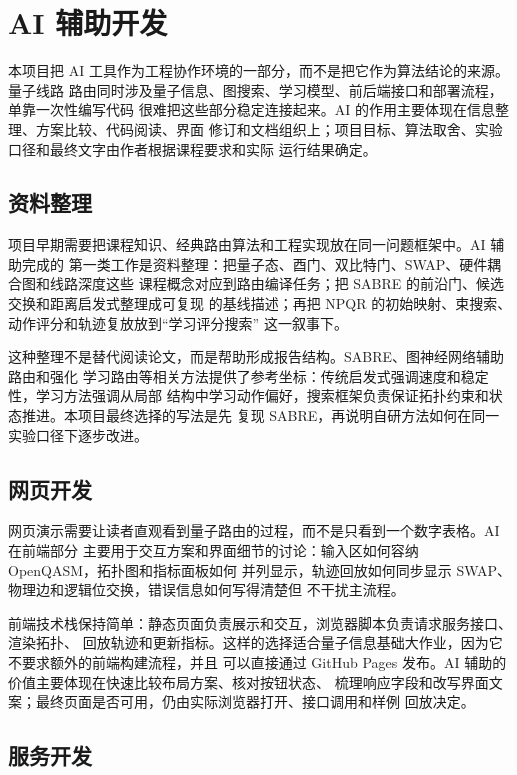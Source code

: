 \section{AI 辅助开发}

本项目把 AI 工具作为工程协作环境的一部分，而不是把它作为算法结论的来源。量子线路
路由同时涉及量子信息、图搜索、学习模型、前后端接口和部署流程，单靠一次性编写代码
很难把这些部分稳定连接起来。AI 的作用主要体现在信息整理、方案比较、代码阅读、界面
修订和文档组织上；项目目标、算法取舍、实验口径和最终文字由作者根据课程要求和实际
运行结果确定。

\subsection{资料整理}

项目早期需要把课程知识、经典路由算法和工程实现放在同一问题框架中。AI 辅助完成的
第一类工作是资料整理：把量子态、酉门、双比特门、SWAP、硬件耦合图和线路深度这些
课程概念对应到路由编译任务；把 SABRE 的前沿门、候选交换和距离启发式整理成可复现
的基线描述；再把 NPQR 的初始映射、束搜索、动作评分和轨迹复放放到“学习评分搜索”
这一叙事下。

这种整理不是替代阅读论文，而是帮助形成报告结构。SABRE、图神经网络辅助路由和强化
学习路由等相关方法提供了参考坐标：传统启发式强调速度和稳定性，学习方法强调从局部
结构中学习动作偏好，搜索框架负责保证拓扑约束和状态推进。本项目最终选择的写法是先
复现 SABRE，再说明自研方法如何在同一实验口径下逐步改进。

\subsection{网页开发}

网页演示需要让读者直观看到量子路由的过程，而不是只看到一个数字表格。AI 在前端部分
主要用于交互方案和界面细节的讨论：输入区如何容纳 OpenQASM，拓扑图和指标面板如何
并列显示，轨迹回放如何同步显示 SWAP、物理边和逻辑位交换，错误信息如何写得清楚但
不干扰主流程。

前端技术栈保持简单：静态页面负责展示和交互，浏览器脚本负责请求服务接口、渲染拓扑、
回放轨迹和更新指标。这样的选择适合量子信息基础大作业，因为它不要求额外的前端构建流程，并且
可以直接通过 GitHub Pages 发布。AI 辅助的价值主要体现在快速比较布局方案、核对按钮状态、
梳理响应字段和改写界面文案；最终页面是否可用，仍由实际浏览器打开、接口调用和样例
回放决定。

\subsection{服务开发}

